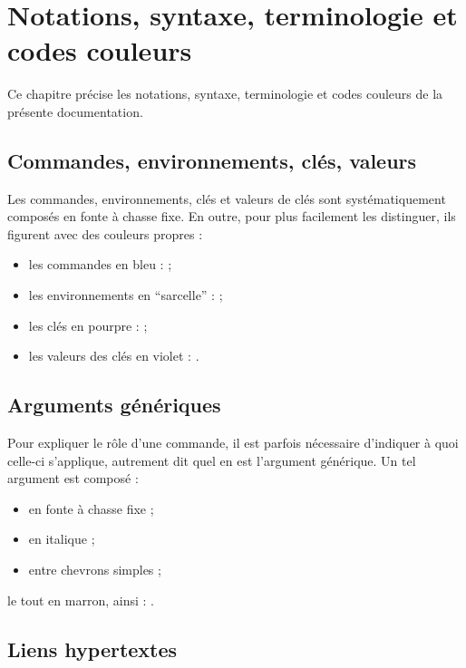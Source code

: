 \chapter{Notations, syntaxe, terminologie et codes couleurs}\label{cha-synt-term-notat}

Ce chapitre précise les notations, syntaxe, terminologie et codes couleurs de
la présente documentation.


\section{Commandes, environnements, clés, valeurs}\label{sec-comm-envir-cles}
%
%
%
%

Les commandes, environnements, clés et valeurs de clés sont systématiquement
composés en fonte à chasse fixe. En outre, pour plus facilement les
distinguer, ils figurent avec des couleurs propres :
\begin{itemize}
\item les commandes en bleu :  ;
\item les environnements en \enquote{sarcelle} :
   ;
\item les clés en pourpre :  ;
\item les valeurs des clés en violet : .
\end{itemize}

\section{Arguments génériques}
\label{sec-arguments-generiques}
%

Pour expliquer le rôle d'une commande, il est parfois nécessaire d'indiquer
à quoi celle-ci s'applique, autrement dit quel en est l'argument générique.
Un tel argument est composé :
\begin{itemize}
\item en fonte à chasse fixe ;
\item en italique ;
\item entre chevrons simples ;
\end{itemize}
le tout en marron, ainsi : .

\section{Liens hypertextes}
\label{sec-liens-hypertextes}
%

